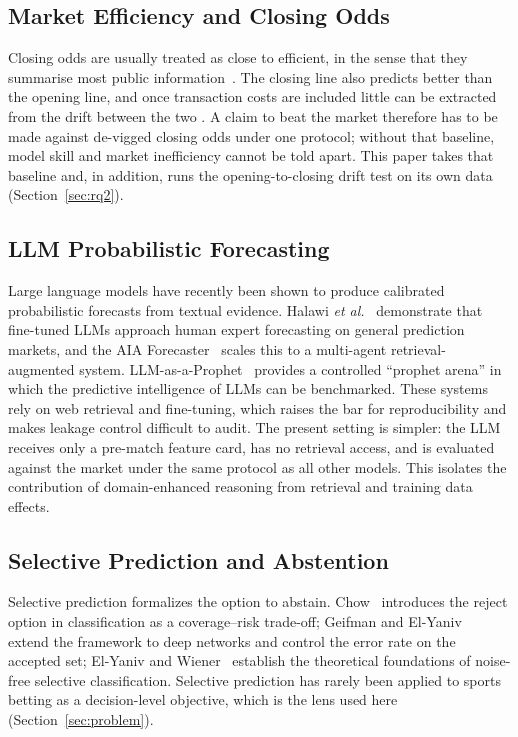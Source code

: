 \documentclass[10pt]{article}
\begin{document}
\subsection{Market Efficiency and Closing Odds}
Closing odds are usually treated as close to efficient, in the sense that they
summarise most public information~\cite{levitt2004,franck2010}. The closing line
also predicts better than the opening line, and once transaction costs are
included little can be extracted from the drift between the two
\cite{dixoncoles1997}. A claim to beat the market therefore has to be made
against de-vigged closing odds under one protocol; without that baseline, model
skill and market inefficiency cannot be told apart. This paper takes that
baseline and, in addition, runs the opening-to-closing drift test on its own
data (Section~\ref{sec:rq2}).

\subsection{LLM Probabilistic Forecasting}
Large language models have recently been shown to produce calibrated
probabilistic forecasts from textual evidence. Halawi \emph{et al.}~\cite{halawi2024}
demonstrate that fine-tuned LLMs approach human expert forecasting on general
prediction markets, and the AIA Forecaster~\cite{aia2025} scales this to a
multi-agent retrieval-augmented system. LLM-as-a-Prophet~\cite{llmprophet2025}
provides a controlled ``prophet arena'' in which the predictive intelligence of
LLMs can be benchmarked. These systems rely on web retrieval and fine-tuning,
which raises the bar for reproducibility and makes leakage control difficult to
audit. The present setting is simpler: the LLM receives only a
pre-match feature card, has no retrieval access, and is evaluated against the
market under the same protocol as all other models. This isolates the
contribution of domain-enhanced reasoning from retrieval and training data
effects.

\subsection{Selective Prediction and Abstention}
Selective prediction formalizes the option to abstain. Chow~\cite{chow1970}
introduces the reject option in classification as a coverage--risk trade-off;
Geifman and El-Yaniv~\cite{geifman2017} extend the framework to deep networks
and control the error rate on the accepted set; El-Yaniv and
Wiener~\cite{elyaniv2010} establish the theoretical foundations of noise-free
selective classification. Selective prediction has rarely been applied to
sports betting as a decision-level objective, which is the lens used here
(Section~\ref{sec:problem}).
\end{document}

